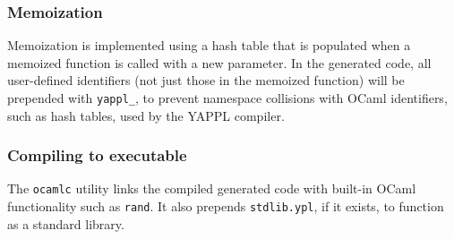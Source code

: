 \subsubsection{Memoization}
Memoization is implemented using a hash table that is populated when a memoized function is called with a new parameter.  In the generated code, all user-defined identifiers (not just those in the memoized function) will be prepended with \texttt{yappl\_}, to prevent namespace collisions with OCaml identifiers, such as hash tables, used by the YAPPL compiler.
\subsubsection{Compiling to executable}
The \texttt{ocamlc} utility links the compiled generated code with built-in OCaml functionality such as \texttt{rand}. It also prepends \texttt{stdlib.ypl}, if it exists, to function as a standard library.